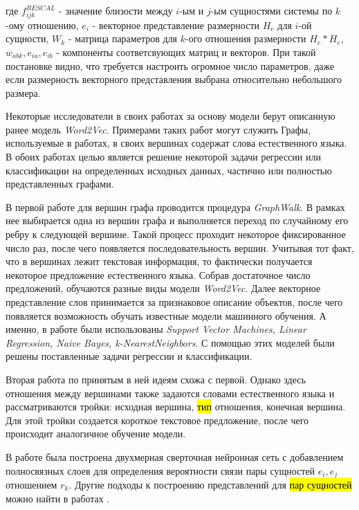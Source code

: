 где $f_{ijk}^{RESCAL}$ - значение близости между $i$-ым и $j$-ым сущностями системы по $k$-ому отношению, $e_i$ - векторное представление размерности $H_e$ для $i$-ой сущности, $W_k$ - матрица параметров для $k$-ого отношения размерности $H_e * H_e$, $w_{abk},e_{ia},e_{ib}$ - компоненты соответсвующих матриц и векторов. При такой постановке видно, что требуется настроить огромное число параметров, даже если размерность векторного представления выбрана относительно небольшого размера.

Некоторые исследователи в своих работах за основу модели берут описанную ранее модель \emph{Word2Vec}. Примерами таких работ могут служить \cite{graph_emb,kg2vec} Графы, используемые в работах, в своих вершинах содержат слова естественного языка. В обоих работах целью является решение некоторой задачи регрессии или классификации на определенных исходных данных, частично или полностью представленных графами.

В первой работе для вершин графа проводится процедура \emph{GraphWalk}. В рамках нее выбирается одна из вершин графа и выполняется переход по случайному его ребру к следующей вершине. Такой процесс проходит некоторое фиксированное число раз, после чего появляется последовательность вершин. Учитывая тот факт, что в вершинах лежит текстовая информация, то фактически получается некоторое предложение естественного языка. Собрав достаточное число предложений, обучаются разные виды модели \emph{Word2Vec}. Далее векторное представление слов  принимается за признаковое описание объектов, после чего появляется возможность обучать известные модели машинного обучения. А именно, в работе были использованы \emph{Support Vector Machines, Linear Regression, Naive Bayes, k-NearestNeighbors}. С помощью этих моделей были решены поставленные задачи регрессии и классификации.

Вторая работа по принятым в ней идеям схожа с первой. Однако здесь отношения между вершинами также задаются словами естественного языка и рассматриваются тройки: исходная вершина, \hl{тип} отношения, конечная вершина. Для этой тройки создается короткое текстовое предложение, после чего происходит аналогичное обучение модели.

В работе \cite{convkg} была построена двухмерная сверточная нейронная сеть с добавлением полносвязных слоев для определения вероятности связи пары сущностей $e_i, e_j$ отношением $r_k$. Другие подходы к построению представлений для \hl{пар сущностей} можно найти в работах \cite{NIPS2013_5028, trouillon16}. 

